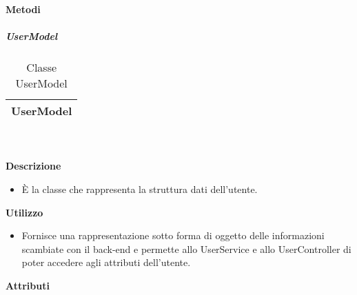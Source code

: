 		\textbf{Metodi} 
	\begin{itemize}
		\end{itemize}
			\subparagraph{UserModel} 
\begin{table}[ht]
\begin{center}
\bgroup
	\setlength{\arrayrulewidth}{0.6mm}
	\def\arraystretch{1}
		\begin{tabular}{ | p{12cm} | }
				\hline  
					\centerline{\textbf{UserModel}}
		\\ \hline 
				\hline
				\hline
		
		\end{tabular}
\egroup
\caption{Classe UserModel}
\end{center}
\end{table}  \textbf{\\ \\ Descrizione} 
					\begin{itemize}
						\item[] È la classe che rappresenta la struttura dati dell'utente.
					\end{itemize}      
				\textbf{Utilizzo}  
					\begin{itemize}
						\item[] Fornisce una rappresentazione sotto forma di oggetto delle informazioni scambiate con il back-end e permette allo UserService e allo UserController di poter accedere agli attributi dell'utente.
					\end{itemize}
			 \textbf{Attributi} 
	\begin{itemize}
		\end{itemize}
		
